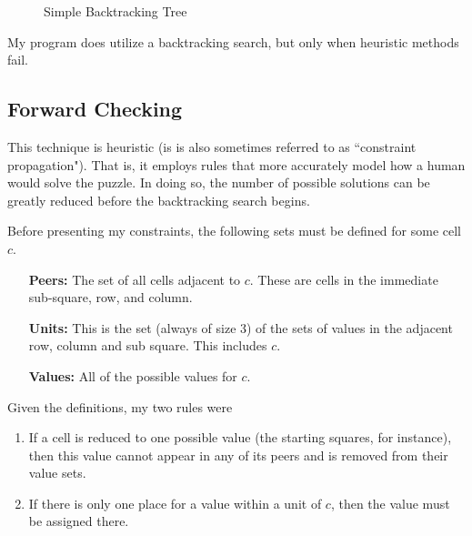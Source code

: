 \documentclass{article}
\begin{document}
\begin{figure}[h!]
\begin{center}
	\caption{Simple Backtracking Tree}
\end{center}
\end{figure}

My program does utilize a backtracking search, but only when heuristic methods fail.

\subsection*{Forward Checking}

This technique is heuristic (is is also sometimes referred to as ``constraint propagation"). That is, it employs rules that more accurately model how a human would solve the puzzle. In doing so, the number of possible solutions can be greatly reduced before the backtracking search begins.

Before presenting my constraints, the following sets must be defined for some cell $c$.

\begin{itemize}[leftmargin=3cm]
	\item [\textbf{Peers:}] The set of all cells adjacent to $c$. These are cells in the immediate sub-square, row, and column.
	\item [\textbf{Units:}] This is the set (always of size 3) of the sets of values in the adjacent row, column and sub square. This includes $c$. 
	\item [\textbf{Values:}] All of the possible values for $c$.
\end{itemize}

Given the definitions, my two rules were

\begin{enumerate}[leftmargin=3cm]
	\item If a cell is reduced to one possible value (the starting squares, for instance), then this value cannot appear in any of its peers and is removed from their value sets. 
	\item If there is only one place for a value within a unit of $c$, then the value must be assigned there.
\end{enumerate}
\end{document}
